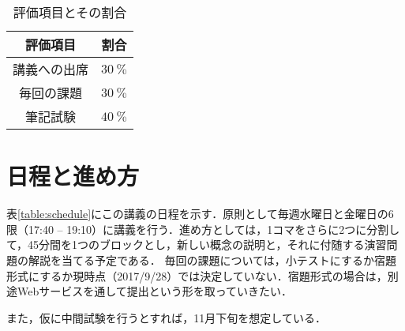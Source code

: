 \begin{table}[!h]
	\centering
	\caption{評価項目とその割合}
	\label{table:criteria}
	\begin{tabular}{c|c}
		評価項目 & 割合 \\
		\hline
		講義への出席 & $\SI{30}{\percent}$ \\
		毎回の課題 & $\SI{30}{\percent}$ \\
		筆記試験 & $\SI{40}{\percent}$ \\
	\end{tabular}
\end{table}

\section{日程と進め方}
表\ref{table:schedule}にこの講義の日程を示す．原則として毎週水曜日と金曜日の6限（17:40 -- 19:10）に講義を行う．進め方としては，1コマをさらに2つに分割して，45分間を1つのブロックとし，新しい概念の説明と，それに付随する演習問題の解説を当てる予定である．
毎回の課題については，小テストにするか宿題形式にするか現時点（2017/9/28）では決定していない．宿題形式の場合は，別途Webサービスを通して提出という形を取っていきたい．

また，仮に中間試験を行うとすれば，11月下旬を想定している．

